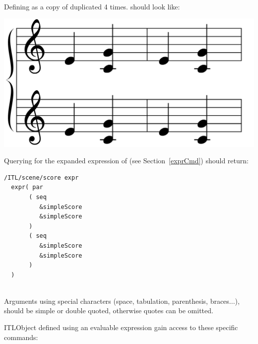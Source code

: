 \example\\
Defining  as a copy of  duplicated 4 times.
 should look like:\\
\begin{center}
 \includegraphics[scale=0.1]{imgs/seqparEnhanced}
\end{center}

Querying for the expanded expression of  (see Section~\ref{exprCmd}) should return:
\begin{verbatim}
/ITL/scene/score expr
  expr( par
       ( seq
          &simpleScore
          &simpleScore
       )
       ( seq
          &simpleScore
          &simpleScore
       )
  )
\end{verbatim}
\smallbreak

 \\
Arguments using special characters (space, tabulation, parenthesis, braces...), should be simple or double quoted, otherwise quotes can be omitted.



\label{exprCmd}

ITLObject defined using an evaluable expression gain access to these specific commands:

